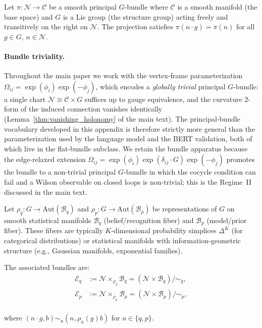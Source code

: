 \documentclass[twoside,11pt]{article}
\begin{document}
Let $\pi: \mathcal{N} \to \mathcal{C}$ be a smooth principal $G$-bundle where $\mathcal{C}$ is a smooth manifold (the base space) and $G$ is a Lie group (the structure group) acting freely and transitively on the right on $\mathcal{N}$. The projection satisfies $\pi(n \cdot g) = \pi(n)$ for all $g \in G$, $n \in \mathcal{N}$.

\paragraph{Bundle triviality.} Throughout the main paper we work with the vertex-frame parameterization $\Omega_{ij} = \exp(\phi_i)\exp(-\phi_j)$, which encodes a \emph{globally trivial} principal $G$-bundle: a single chart $\mathcal{N} \cong \mathcal{C} \times G$ suffices up to gauge equivalence, and the curvature 2-form of the induced connection vanishes identically (Lemma~\ref{thm:vanishing_holonomy} of the main text). The principal-bundle vocabulary developed in this appendix is therefore strictly more general than the parameterization used by the language model and the BERT validation, both of which live in the flat-bundle subclass. We retain the bundle apparatus because the edge-relaxed extension $\Omega_{ij} = \exp(\phi_i)\exp(\delta_{ij}\cdot G)\exp(-\phi_j)$ promotes the bundle to a non-trivial principal $G$-bundle in which the cocycle condition can fail and a Wilson observable on closed loops is non-trivial; this is the Regime~II discussed in the main text.

Let $\rho_q: G \to \text{Aut}(\mathcal{B}_q)$ and $\rho_p: G \to \text{Aut}(\mathcal{B}_p)$ be representations of $G$ on smooth statistical manifolds $\mathcal{B}_q$ (belief/recognition fiber) and $\mathcal{B}_p$ (model/prior fiber). These fibers are typically $K$-dimensional probability simplices $\Delta^K$ (for categorical distributions) or statistical manifolds with information-geometric structure (e.g., Gaussian manifolds, exponential families).

The associated bundles are:\\
\begin{align}
\mathcal{E}_q &:= \mathcal{N} \times_{\rho_q} \mathcal{B}_q = \left(\mathcal{N} \times \mathcal{B}_q\right)/\sim_q, \\
\mathcal{E}_p &:= \mathcal{N} \times_{\rho_p} \mathcal{B}_p = \left(\mathcal{N} \times \mathcal{B}_p\right)/\sim_p,
\end{align}\\
where $(n \cdot g, b) \sim_u (n, \rho_u(g)b)$ for $u \in \{q,p\}$.
\end{document}
